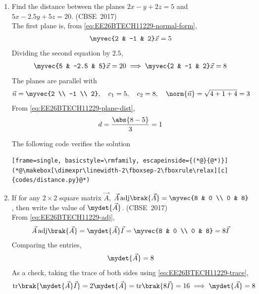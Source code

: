 \begin{enumerate}[label=\thesubsection.\arabic*, ref=\thesubsection.\theenumi]
\item 
Find the distance between the planes $2x - y + 2z = 5$ and $5x - 2.5y + 5z = 20$.
\hfill (CBSE~2017)
\\
\solution
The first plane is, from \eqref{eq:EE26BTECH11229-normal-form},
\begin{align}
	\myvec{2 & -1 & 2}\vec{x} = 5
\end{align}
Dividing the second equation by $2.5$,
\begin{align}
	\myvec{5 & -2.5 & 5}\vec{x} = 20 \implies \myvec{2 & -1 & 2}\vec{x} = 8
\end{align}
The planes are parallel with
\begin{align}
	\vec{n} = \myvec{2 \\ -1 \\ 2}, \quad c_1 = 5, \quad c_2 = 8, \quad \norm{\vec{n}} = \sqrt{4 + 1 + 4} = 3
\end{align}
From \eqref{eq:EE26BTECH11229-plane-dist},
\begin{align}
	d = \frac{\abs{8 - 5}}{3} = 1
\end{align}

The following code verifies the solution
\begin{lstlisting}[frame=single, basicstyle=\rmfamily, escapeinside={(*@}{@*)}]
(*@\makebox[\dimexpr\linewidth-2\fboxsep-2\fboxrule\relax][c]{codes/distance.py}@*)
\end{lstlisting}

\item 
If for any $2 \times 2$ square matrix $\vec{A}$, $\vec{A}\,\text{adj}\brak{\vec{A}} = \myvec{8 & 0 \\ 0 & 8}$, then write the value of $\mydet{\vec{A}}$.
\hfill (CBSE~2017)
\\
\solution
From \eqref{eq:EE26BTECH11229-adj},
\begin{align}
	\vec{A}\,\text{adj}\brak{\vec{A}} = \mydet{\vec{A}}\vec{I} = \myvec{8 & 0 \\ 0 & 8} = 8\vec{I}
\end{align}
Comparing the entries,
\begin{align}
	\mydet{\vec{A}} = 8
\end{align}
As a check, taking the trace of both sides using \eqref{eq:EE26BTECH11229-trace},
\begin{align}
	\text{tr}\brak{\mydet{\vec{A}}\vec{I}} = 2\mydet{\vec{A}} = \text{tr}\brak{8\vec{I}} = 16 \implies \mydet{\vec{A}} = 8
\end{align}


\end{enumerate}
